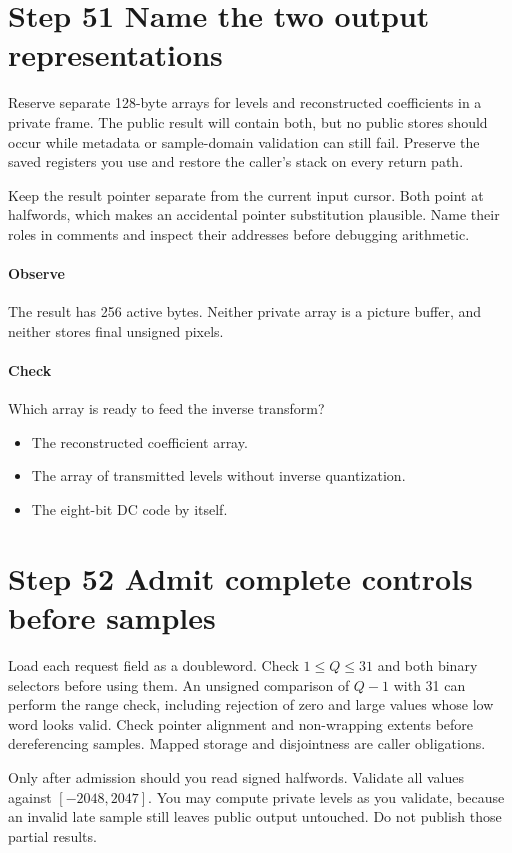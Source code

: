 \section{Step 51 Name the two output representations}\label{h263-quant-s01}
Reserve separate 128-byte arrays for levels and reconstructed coefficients in a
private frame. The public result will contain both, but no public stores should
occur while metadata or sample-domain validation can still fail. Preserve the
saved registers you use and restore the caller's stack on every return path.

Keep the result pointer separate from the current input cursor. Both point at
halfwords, which makes an accidental pointer substitution plausible. Name their
roles in comments and inspect their addresses before debugging arithmetic.

\paragraph{Observe} The result has 256 active bytes. Neither private array
is a picture buffer, and neither stores final unsigned pixels.
\paragraph{Check} Which array is ready to feed the inverse transform?
\begin{itemize}
  \item[A.] The reconstructed coefficient array.
  \item[B.] The array of transmitted levels without inverse quantization.
  \item[C.] The eight-bit DC code by itself.
\end{itemize}

\section{Step 52 Admit complete controls before samples}\label{h263-quant-s02}
Load each request field as a doubleword. Check $1\leq Q\leq31$ and both binary
selectors before using them. An unsigned comparison of $Q-1$ with 31 can perform
the range check, including rejection of zero and large values whose low word
looks valid. Check pointer alignment and non-wrapping extents before dereferencing
samples. Mapped storage and disjointness are caller obligations.

Only after admission should you read signed halfwords. Validate all values against
$[-2048,2047]$. You may compute private levels as you validate, because an invalid
late sample still leaves public output untouched. Do not publish those partial
results.

